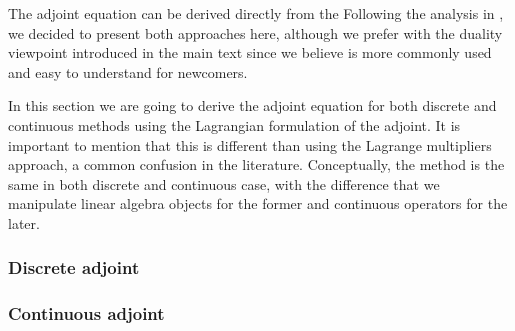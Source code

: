 \label{appendix:lagrangian}


The adjoint equation can be derived directly from the 
Following the analysis in \cite{Giles_Pierce_2000}, we decided to present both approaches here, although we prefer with the duality viewpoint introduced in the main text since we believe is more commonly used and easy to understand for newcomers. 

In this section we are going to derive the adjoint equation for both discrete and continuous methods using the Lagrangian formulation of the adjoint. 
It is important to mention that this is different than using the Lagrange multipliers approach, a common confusion in the literature\cite{Givoli_2021}.
Conceptually, the method is the same in both discrete and continuous case, with the difference that we manipulate linear algebra objects for the former and continuous operators for the later. 

\subsubsection{Discrete adjoint}

\subsubsection{Continuous adjoint}

